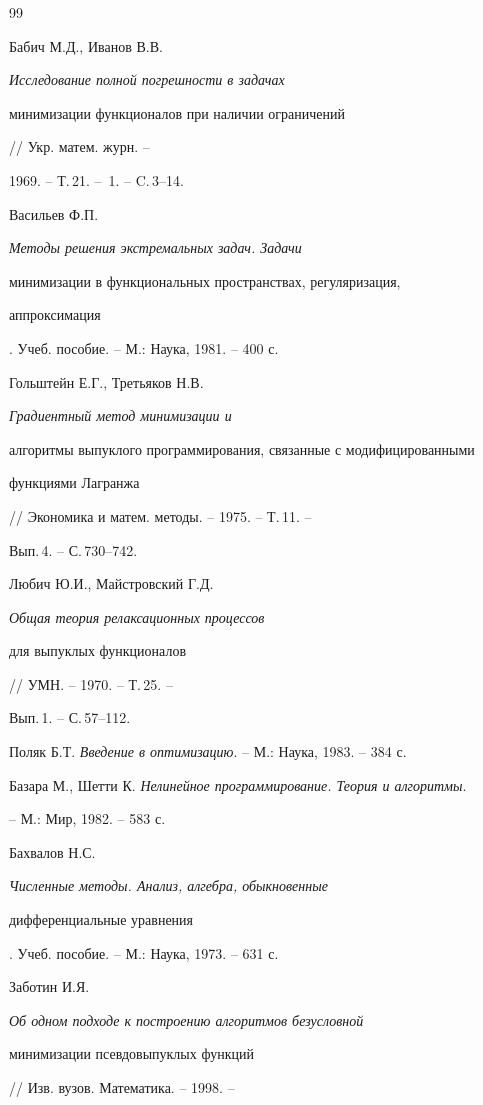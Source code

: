 \begin{thebibliography}{99}







Бабич М.Д., Иванов В.В. {\em Исследование полной погрешности в задачах


минимизации функционалов при наличии ограничений} // Укр. матем. журн. --


1969. -- Т.\,21. -- \No\,1. -- C.\,3--14.




Васильев Ф.П. {\em Методы решения экстремальных задач. Задачи


минимизации в функциональных пространствах, регуляризация,


аппроксимация}. Учеб. пособие. -- М.: Наука, 1981. -- 400 с.




Гольштейн Е.Г., Третьяков Н.В. {\em Градиентный метод минимизации и


алгоритмы выпуклого программирования, связанные с модифицированными


функциями Лагранжа} // Экономика и матем. методы. -- 1975. -- Т.\,11. --


Вып.\,4. -- С.\,730--742.




Любич Ю.И., Майстровский Г.Д. {\em Общая теория релаксационных процессов


для выпуклых функционалов} // УМН. -- 1970. -- Т.\,25. --


Вып.\,1. -- С.\,57--112.




Поляк Б.Т. {\em Введение в оптимизацию}. -- М.: Наука, 1983. -- 384 с.




Базара М., Шетти К. {\em Нелинейное программирование. Теория и алгоритмы}.


-- М.: Мир, 1982. -- 583 с.




Бахвалов Н.С. {\em Численные методы. Анализ, алгебра, обыкновенные


дифференциальные уравнения}. Учеб. пособие. -- М.: Наука, 1973. -- 631 с.




Заботин И.Я. {\em Об одном подходе к построению алгоритмов безусловной


минимизации псевдовыпуклых функций} // Изв. вузов. Математика. -- 1998. --



\end{thebibliography}
